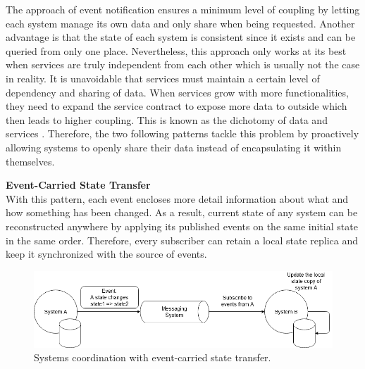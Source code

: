 The approach of event notification ensures a minimum level of coupling by letting each system manage its own data and only share when being requested. Another advantage is that the state of each system is consistent since it exists and can be queried from only one place. Nevertheless, this approach only works at its best when services are truly independent from each other which is usually not the case in reality. It is unavoidable that services must maintain a certain level of dependency and sharing of data. When services grow with more functionalities, they need to expand the service contract to expose more data to outside which then leads to higher coupling. This is known as the dichotomy of data and services \cite{stopford2018designing}. Therefore, the two following patterns tackle this problem by proactively allowing systems to openly share their data instead of encapsulating it within themselves.

\textbf{Event-Carried State Transfer}\\
With this pattern, each event encloses more detail information about what and how something has been changed. As a result, current state of any system can be reconstructed anywhere by applying its published events on the same initial state in the same order. Therefore, every subscriber can retain a local state replica and keep it synchronized with the source of events.

\begin{figure}[h]
	\includegraphics[width=\linewidth]{images/eventstatetransfer.png}
	\caption{Systems coordination with event-carried state transfer.}
	\label{fig:eventstatetransfer}
\end{figure}

